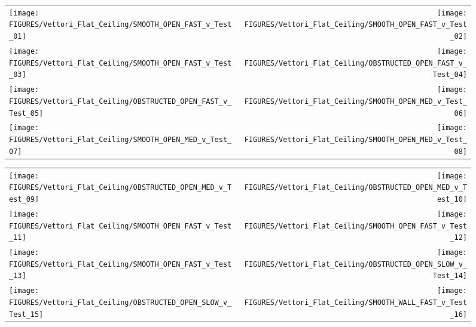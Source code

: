 \begin{figure}[p]
\begin{tabular*}{\textwidth}{l@{\extracolsep{\fill}}r}
\texttt{[image: FIGURES/Vettori\_Flat\_Ceiling/SMOOTH\_OPEN\_FAST\_v\_Test\_01]} &
\texttt{[image: FIGURES/Vettori\_Flat\_Ceiling/SMOOTH\_OPEN\_FAST\_v\_Test\_02]} \\
\texttt{[image: FIGURES/Vettori\_Flat\_Ceiling/SMOOTH\_OPEN\_FAST\_v\_Test\_03]} &
\texttt{[image: FIGURES/Vettori\_Flat\_Ceiling/OBSTRUCTED\_OPEN\_FAST\_v\_Test\_04]} \\
\texttt{[image: FIGURES/Vettori\_Flat\_Ceiling/OBSTRUCTED\_OPEN\_FAST\_v\_Test\_05]} &
\texttt{[image: FIGURES/Vettori\_Flat\_Ceiling/SMOOTH\_OPEN\_MED\_v\_Test\_06]} \\
\texttt{[image: FIGURES/Vettori\_Flat\_Ceiling/SMOOTH\_OPEN\_MED\_v\_Test\_07]} &
\texttt{[image: FIGURES/Vettori\_Flat\_Ceiling/SMOOTH\_OPEN\_MED\_v\_Test\_08]} \\
\end{tabular*}
\label{Vettori_1}
\end{figure}

\begin{figure}[p]
\begin{tabular*}{\textwidth}{l@{\extracolsep{\fill}}r}
\texttt{[image: FIGURES/Vettori\_Flat\_Ceiling/OBSTRUCTED\_OPEN\_MED\_v\_Test\_09]} &
\texttt{[image: FIGURES/Vettori\_Flat\_Ceiling/OBSTRUCTED\_OPEN\_MED\_v\_Test\_10]} \\
\texttt{[image: FIGURES/Vettori\_Flat\_Ceiling/SMOOTH\_OPEN\_FAST\_v\_Test\_11]} &
\texttt{[image: FIGURES/Vettori\_Flat\_Ceiling/SMOOTH\_OPEN\_FAST\_v\_Test\_12]} \\
\texttt{[image: FIGURES/Vettori\_Flat\_Ceiling/SMOOTH\_OPEN\_FAST\_v\_Test\_13]} &
\texttt{[image: FIGURES/Vettori\_Flat\_Ceiling/OBSTRUCTED\_OPEN\_SLOW\_v\_Test\_14]} \\
\texttt{[image: FIGURES/Vettori\_Flat\_Ceiling/OBSTRUCTED\_OPEN\_SLOW\_v\_Test\_15]} &
\texttt{[image: FIGURES/Vettori\_Flat\_Ceiling/SMOOTH\_WALL\_FAST\_v\_Test\_16]} \\
\end{tabular*}
\label{Vettori_2}
\end{figure}


